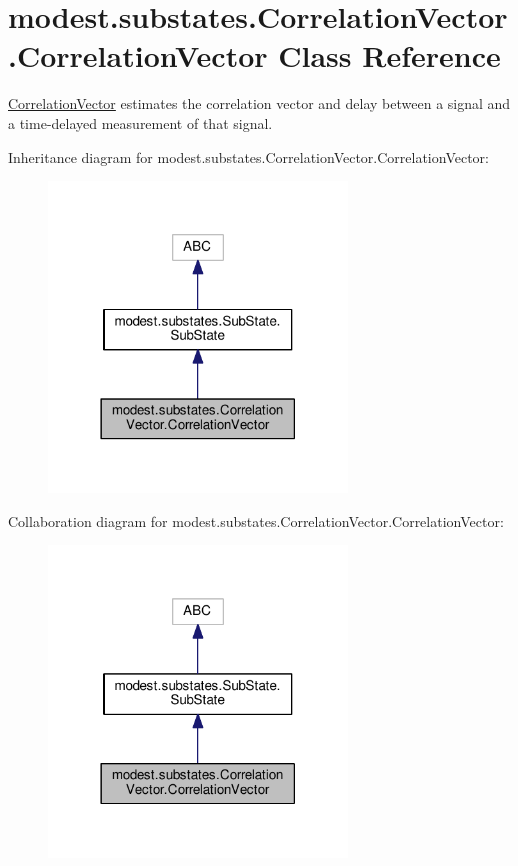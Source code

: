 \hypertarget{classmodest_1_1substates_1_1CorrelationVector_1_1CorrelationVector}{}\section{modest.\+substates.\+Correlation\+Vector.\+Correlation\+Vector Class Reference}
\label{classmodest_1_1substates_1_1CorrelationVector_1_1CorrelationVector}


\hyperlink{classmodest_1_1substates_1_1CorrelationVector_1_1CorrelationVector}{Correlation\+Vector} estimates the correlation vector and delay between a signal and a time-\/delayed measurement of that signal.  




Inheritance diagram for modest.\+substates.\+Correlation\+Vector.\+Correlation\+Vector\+:\nopagebreak
\begin{figure}[H]
\begin{center}
\leavevmode
\includegraphics[width=225pt]{classmodest_1_1substates_1_1CorrelationVector_1_1CorrelationVector__inherit__graph}
\end{center}
\end{figure}


Collaboration diagram for modest.\+substates.\+Correlation\+Vector.\+Correlation\+Vector\+:\nopagebreak
\begin{figure}[H]
\begin{center}
\leavevmode
\includegraphics[width=225pt]{classmodest_1_1substates_1_1CorrelationVector_1_1CorrelationVector__coll__graph}
\end{center}
\end{figure}
